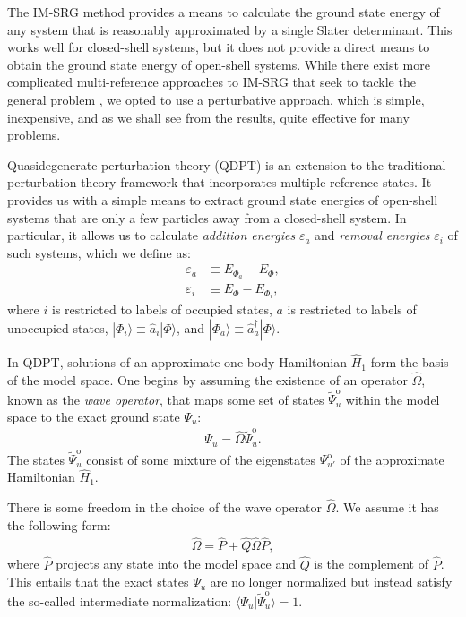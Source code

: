 The IM-SRG method provides a means to calculate the ground state energy of any system that is reasonably approximated by a single Slater determinant.  This works well for closed-shell systems, but it does not provide a direct means to obtain the ground state energy of open-shell systems.  While there exist more complicated multi-reference approaches to IM-SRG that seek to tackle the general problem \cite{Hergert2016165}, we opted to use a perturbative approach, which is simple, inexpensive, and as we shall see from the results, quite effective for many problems.

Quasidegenerate perturbation theory (QDPT) is an extension to the traditional perturbation theory framework that incorporates multiple reference states.  It provides us with a simple means to extract ground state energies of open-shell systems that are only a few particles away from a closed-shell system.  In particular, it allows us to calculate \textit{addition energies} $\varepsilon_a$ and \textit{removal energies} $\varepsilon_i$ of such systems, which we define as:
\begin{align}
  \varepsilon_a &\equiv E_{\Phi_a} - E_{\Phi}, \\
  \varepsilon_i &\equiv E_{\Phi} - E_{\Phi_i},
\end{align}
where $i$ is restricted to labels of occupied states, $a$ is restricted to labels of unoccupied states, $|\Phi_i\rangle \equiv \hat{a}_i^{} |\Phi\rangle$, and $|\Phi_a\rangle \equiv \hat{a}_a^\dagger |\Phi\rangle$.

In QDPT, solutions of an approximate one-body Hamiltonian $\hat{H}_1$ form the basis of the model space.  One begins by assuming the existence of an operator $\hat{\Omega}$, known as the \textit{wave operator}, that maps some set of states $\tilde \Psi^{\mathrm{o}}_u$ within the model space to the exact ground state $\Psi_u$:
\begin{align} \label{eq:omega-condition1}
  \Psi_u = \hat \Omega \tilde \Psi^{\mathrm{o}}_u.
\end{align}
The states $\tilde \Psi^{\mathrm{o}}_u$ consist of some mixture of the eigenstates $\Psi^{\mathrm{o}}_{u'}$ of the approximate Hamiltonian $\hat{H}_1$.

There is some freedom in the choice of the wave operator $\hat \Omega$.  We assume it has the following form:
\begin{align} \label{eq:omega-condition2}
  \hat \Omega = \hat P + \hat Q \hat \Omega \hat P,
\end{align}
where $\hat P$ projects any state into the model space and $\hat Q$ is the complement of $\hat P$.  This entails that the exact states $\Psi_u$ are no longer normalized but instead satisfy the so-called intermediate normalization: $\langle \Psi_u | \tilde \Psi^{\mathrm{o}}_u \rangle = 1$.

